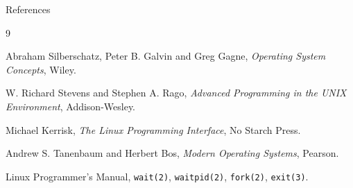 \documentclass[aspectratio=169]{beamer}
\begin{document}









\begin{frame}{References}

\small

\begin{thebibliography}{9}

Abraham Silberschatz, Peter B. Galvin and Greg Gagne,
\newblock \emph{Operating System Concepts},
\newblock Wiley.

W. Richard Stevens and Stephen A. Rago,
\newblock \emph{Advanced Programming in the UNIX Environment},
\newblock Addison-Wesley.

Michael Kerrisk,
\newblock \emph{The Linux Programming Interface},
\newblock No Starch Press.

Andrew S. Tanenbaum and Herbert Bos,
\newblock \emph{Modern Operating Systems},
\newblock Pearson.

Linux Programmer's Manual,
\newblock \texttt{wait(2)}, \texttt{waitpid(2)},
\texttt{fork(2)}, \texttt{exit(3)}.

\end{thebibliography}

\end{frame}

\end{document}
